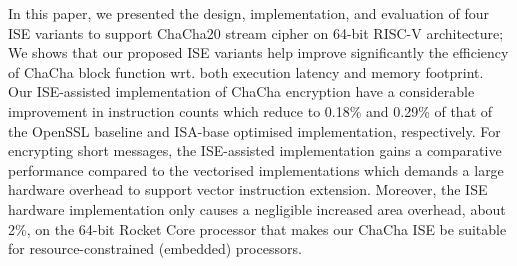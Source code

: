 In this paper, we presented the design, implementation, and evaluation of four ISE variants to support ChaCha20 stream cipher on 64-bit RISC-V architecture; 
We shows that our proposed ISE variants help improve significantly the efficiency of ChaCha block function wrt. both execution latency and memory footprint.  
Our ISE-assisted implementation of ChaCha encryption have a considerable improvement in instruction counts which reduce to 0.18\% and 0.29\% of that of the OpenSSL baseline and ISA-base optimised implementation, respectively. 
For encrypting short messages, the ISE-assisted implementation gains a comparative performance compared to the vectorised implementations which demands a large hardware overhead to support vector instruction extension.
Moreover, the ISE hardware implementation only causes a negligible increased area overhead, about 2\%, on the 64-bit Rocket Core processor that makes our ChaCha ISE be suitable for resource-constrained (embedded) processors.




